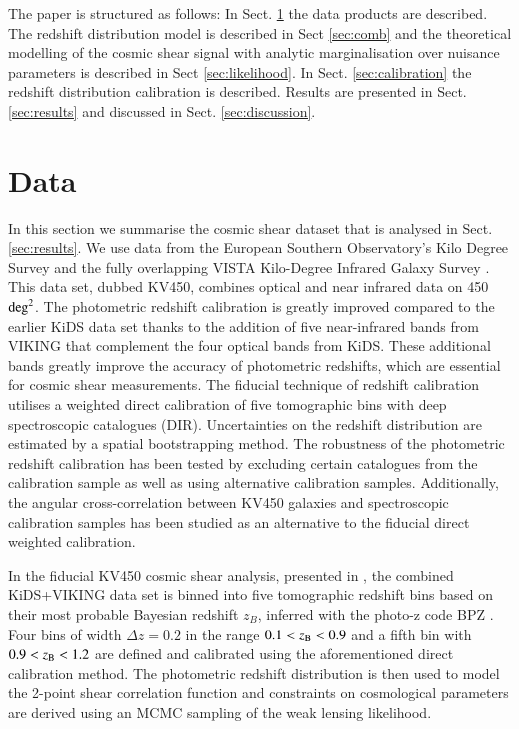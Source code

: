\documentclass{aa}
\begin{document}
The paper is structured as follows: In Sect. \ref{sec:data} the data products are described. The redshift distribution model is described in Sect \ref{sec:comb} and the theoretical modelling of the cosmic shear signal with analytic marginalisation over nuisance parameters is described in Sect \ref{sec:likelihood}. In Sect. \ref{sec:calibration} the redshift distribution calibration is described. Results are presented in Sect. \ref{sec:results} and discussed in Sect. \ref{sec:discussion}.
 
\section{Data}
\label{sec:data}
In this section we summarise the cosmic shear dataset that is analysed in Sect. \ref{sec:results}.
We use data from the European Southern Observatory's Kilo Degree Survey \citep[KiDS; ][]{2015MNRAS.454.3500K,2015A&A...582A..62D,2017A&A...604A.134D} and the fully overlapping VISTA Kilo-Degree Infrared Galaxy Survey \citep[VIKING; ][]{2013Msngr.154...32E}. This data set, dubbed KV450, combines optical and near infrared data on 450 ${\rm deg}^2$. The photometric redshift calibration is greatly improved compared to the earlier KiDS data set \citep{2017MNRAS.465.1454H} thanks to the addition of five near-infrared bands from VIKING that complement the four optical bands from KiDS. These additional bands greatly improve the accuracy of photometric redshifts, which are essential for cosmic shear measurements. The fiducial technique of redshift calibration utilises a weighted direct calibration of five tomographic bins with deep spectroscopic catalogues (DIR). Uncertainties on the redshift distribution are estimated by a spatial bootstrapping method. The robustness of the photometric redshift calibration has been tested by excluding certain catalogues from the calibration sample as well as using alternative calibration samples. Additionally, the angular cross-correlation between KV450 galaxies and spectroscopic calibration samples has been studied as an alternative to the fiducial direct weighted calibration.

In the fiducial KV450 cosmic shear analysis, presented in \cite{hildebrandt18}, the combined KiDS+VIKING data set \citep{2019A&A...632A..34W} is binned into five tomographic redshift bins based on their most probable Bayesian redshift $z_B$, inferred with the photo-z code {\sc BPZ} \citep{2000ApJ...536..571B}. Four bins of width $\Delta z = 0.2$ in the range $0.1 < z_{\rm B} <0.9$ and a fifth bin with $0.9 < z_{\rm B} < 1.2$ are defined and calibrated using the aforementioned direct calibration method. The photometric redshift distribution is then used to model the 2-point shear correlation function and constraints on cosmological parameters are derived using an MCMC sampling of the weak lensing likelihood. 
\end{document}
